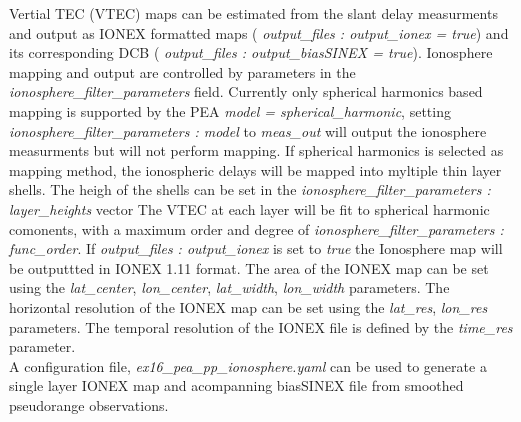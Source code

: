 Vertial TEC (VTEC) maps can be estimated from the slant delay measurments and output as IONEX formatted maps ( \textit{output\_files : output\_ionex = true}) and its corresponding DCB ( \textit{output\_files : output\_biasSINEX = true}).
Ionosphere mapping and output are controlled by parameters in the \textit{ionosphere\_filter\_parameters} field.
Currently only spherical harmonics based mapping is supported by the PEA \textit{model = spherical\_harmonic}, setting  \textit{ionosphere\_filter\_parameters : model} to \textit{meas\_out} will output the ionosphere measurments but will not perform mapping. 
If spherical harmonics is selected as mapping method, the ionospheric delays will be mapped into myltiple thin layer shells.
The heigh of the shells can be set in the \textit{ionosphere\_filter\_parameters : layer\_heights} vector
The VTEC at each layer will be fit to spherical harmonic comonents, with a maximum order and degree of  \textit{ionosphere\_filter\_parameters : func\_order}.
If  \textit{output\_files : output\_ionex} is set to \textit{true} the Ionosphere map will be outputtted in IONEX 1.11 format.
The area of the IONEX map can be set using the \textit{lat\_center}, \textit{lon\_center},  \textit{lat\_width}, \textit{lon\_width} parameters.
The horizontal resolution of the IONEX map can be set using the \textit{lat\_res}, \textit{lon\_res} parameters.
The temporal resolution of the IONEX file is defined by the \textit{time\_res} parameter.\\  

A configuration file, \textit{ex16\_pea\_pp\_ionosphere.yaml} can be used to generate a single layer IONEX map and acompanning biasSINEX file from smoothed pseudorange observations.\\
